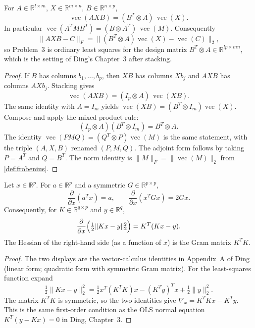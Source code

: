 \documentclass[11pt,a4paper]{article}
\begin{document}
\begin{lemma}[\(\operatorname{vec}(AXB)=(B^{T}\otimes A)\operatorname{vec}(X)\)]
\label{lem:vec-axb}
For \(A\in\mathbb{R}^{l\times m}\), \(X\in\mathbb{R}^{m\times n}\), \(B\in\mathbb{R}^{n\times p}\),
\[
\operatorname{vec}(AXB)
=
(B^{T}\otimes A)\,\operatorname{vec}(X).
\]
In particular \(\operatorname{vec}(A^{T}MB^{T})=(B\otimes A^{T})\,\operatorname{vec}(M)\). Consequently
\[
\|AXB-C\|_{F}
=
\bigl\|(B^{T}\otimes A)\operatorname{vec}(X)-\operatorname{vec}(C)\bigr\|_{2},
\]
so Problem~3 is ordinary least squares for the design matrix \(B^{T}\otimes A\in\mathbb{R}^{lp\times mn}\), which is the setting of Ding's Chapter~3 \cite{ding24} after stacking.
\end{lemma}

\begin{proof}
If \(B\) has columns \(b_{1},\ldots,b_{p}\), then \(XB\) has columns \(Xb_{j}\) and \(AXB\) has columns \(AXb_{j}\). Stacking gives
\[
\operatorname{vec}(AXB)
=
(I_{p}\otimes A)\,\operatorname{vec}(XB).
\]
The same identity with \(A=I_{m}\) yields \(\operatorname{vec}(XB)=(B^{T}\otimes I_{m})\operatorname{vec}(X)\). Compose and apply the mixed-product rule:
\[
(I_{p}\otimes A)(B^{T}\otimes I_{m})
=
B^{T}\otimes A.
\]
The identity \(\operatorname{vec}(PMQ)=(Q^{T}\otimes P)\operatorname{vec}(M)\) is the same statement, with the triple \((A,X,B)\) renamed \((P,M,Q)\). The adjoint form follows by taking \(P=A^{T}\) and \(Q=B^{T}\). The norm identity is \(\|M\|_{F}=\|\operatorname{vec}(M)\|_{2}\) from \cref{def:frobenius}.
\end{proof}

\begin{lemma}
\label{lem:ding-vec-calc}
Let \(x\in\mathbb{R}^{p}\). For \(a\in\mathbb{R}^{p}\) and a symmetric \(G\in\mathbb{R}^{p\times p}\),
\[
\frac{\partial}{\partial x}(a^{T}x)
=
a,
\qquad
\frac{\partial}{\partial x}(x^{T}Gx)
=
2Gx.
\]
Consequently, for \(K\in\mathbb{R}^{q\times p}\) and \(y\in\mathbb{R}^{q}\),
\[
\frac{\partial}{\partial x}\Bigl(\tfrac12\|Kx-y\|_{2}^{2}\Bigr)
=
K^{T}(Kx-y).
\]
The Hessian of the right-hand side (as a function of \(x\)) is the Gram matrix \(K^{T}K\).
\end{lemma}

\begin{proof}
The two displays are the vector-calculus identities in Appendix~A of Ding \cite{ding24} (linear form; quadratic form with symmetric Gram matrix). For the least-squares function expand
\[
\tfrac12\|Kx-y\|_{2}^{2}
=
\tfrac12 x^{T}(K^{T}K)x-(K^{T}y)^{T}x+\tfrac12\|y\|_{2}^{2}.
\]
The matrix \(K^{T}K\) is symmetric, so the two identities give \(\nabla_{x}=K^{T}Kx-K^{T}y\). This is the same first-order condition as the OLS normal equation \(K^{T}(y-Kx)=0\) in Ding, Chapter~3.
\end{proof}
\end{document}
